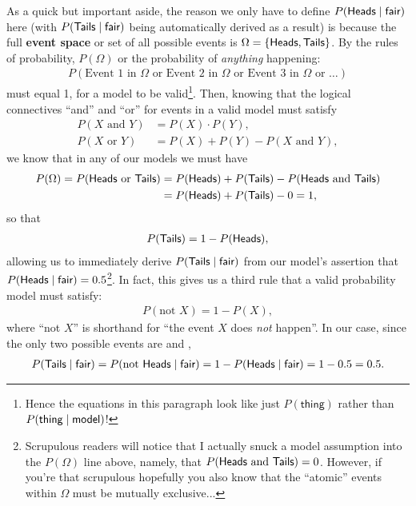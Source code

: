 As a quick but important aside, the reason we only have to define $P(\textsf{Heads}{} \; | \;{} \textsf{fair}{})$ here (with $P(\textsf{Tails}{} \; | \;{} \textsf{fair}{})$ being automatically derived as a result) is because the full \textbf{event space} or set of all possible events is $\Omega = \{\textsf{Heads}{}, \textsf{Tails}{}\}$. By the rules of probability, $P(\Omega)$ or the probability of \textit{anything} happening:
\begin{align*}
	P(\text{Event 1 in  }\Omega\text{ or Event 2 in }\Omega\text{ or Event 3 in }\Omega\text{ or }\ldots)
\end{align*} must equal 1, for a model to be valid\footnote{Hence the equations in this paragraph look like just $P(\textsf{thing})$ rather than $P(\textsf{thing} \; | \;{} \textsf{model})$!}. Then, knowing that the logical connectives ``and'' and ``or'' for events in a valid model must satisfy
\begin{align*}
	P(X\text{ and }Y) &= P(X)\cdot P(Y), \\
	P(X\text{ or }Y) &= P(X) + P(Y) - P(X\text{ and }Y),
\end{align*}
we know that in any of our models we must have
\begin{align*}
	P(\Omega) = P(\textsf{Heads}{}\text{ or }\textsf{Tails}{}) &= P(\textsf{Heads}{}) + P(\textsf{Tails}{}) - P(\textsf{Heads}{}\text{ and }\textsf{Tails}{}) \\
	&= P(\textsf{Heads}{}) + P(\textsf{Tails}{}) - 0 = 1,
\end{align*}
so that
\begin{align*}
	P(\textsf{Tails}{}) = 1 - P(\textsf{Heads}{}),
\end{align*}
allowing us to immediately derive $P(\textsf{Tails}{} \; | \;{} \textsf{fair}{})$ from our model's assertion that $P(\textsf{Heads}{} \; | \;{} \textsf{fair}{}) = 0.5$\footnote{Scrupulous readers will notice that I actually snuck a model assumption into the $P(\Omega)$ line above, namely, that $P(\textsf{Heads}{}\text{ and }\textsf{Tails}{}) = 0$. However, if you're that scrupulous hopefully you also know that the ``atomic'' events within $\Omega$ must be mutually exclusive...}. In fact, this gives us a third rule that a valid probability model must satisfy:
\begin{align*}
	P(\text{not }X) = 1 - P(X),
\end{align*}
where ``not $X$'' is shorthand for ``the event $X$ does \textit{not} happen''. In our case, since the only two possible events are \Heads{} and \Tails{},
\begin{align*}
	P(\textsf{Tails}{} \; | \;{} \textsf{fair}{}) = P(\text{not }\textsf{Heads}{}\; | \;{}\textsf{fair}{}) = 1 - P(\textsf{Heads}{} \; | \;{} \textsf{fair}{}) = 1 - 0.5 = 0.5.
\end{align*}

